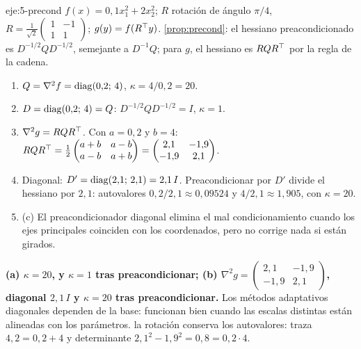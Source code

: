 \begin{solucion}{eje:5-precond}
\datos $f(x)=0{,}1x_1^{2}+2x_2^{2}$; $R$ rotación de ángulo $\pi/4$, $R=\frac{1}{\sqrt2}\begin{pmatrix}1&-1\\1&1\end{pmatrix}$; $g(y)=f(R^{\top} y)$.
\planteamiento \cref{prop:precond}: el hessiano preacondicionado es $D^{-1/2}QD^{-1/2}$, semejante a $D^{-1}Q$; para $g$, el hessiano es $RQR^{\top}$ por la regla de la cadena.
\pasos
\begin{enumerate}[label=\arabic*.]
  \item $Q=\nabla^{2}f=\operatorname{diag}(0{,}2;\,4)$, $\kappa=4/0{,}2=20$.
  \item $D=\operatorname{diag}(0{,}2;\,4)=Q$: $D^{-1/2}QD^{-1/2}=I$, $\kappa=1$.
  \item $\nabla^{2}g=RQR^{\top}$. Con $a=0{,}2$ y $b=4$: $RQR^{\top}=\frac12\begin{pmatrix}a+b&a-b\\a-b&a+b\end{pmatrix}=\begin{pmatrix}2{,}1&-1{,}9\\-1{,}9&2{,}1\end{pmatrix}$.
  \item Diagonal: $D'=\operatorname{diag}(2{,}1;\,2{,}1)=2{,}1\,I$. Preacondicionar por $D'$ divide el hessiano por $2{,}1$: autovalores $0{,}2/2{,}1\approx 0{,}09524$ y $4/2{,}1\approx 1{,}905$, con $\kappa=20$.
  \item (c) El preacondicionador diagonal elimina el mal condicionamiento cuando los ejes principales coinciden con los coordenados, pero no corrige nada si están girados.
\end{enumerate}
\resultado \textbf{(a) $\kappa=20$, y $\kappa=1$ tras preacondicionar; (b) $\nabla^{2}g=\begin{pmatrix}2{,}1&-1{,}9\\-1{,}9&2{,}1\end{pmatrix}$, diagonal $2{,}1\,I$ y $\kappa=20$ tras preacondicionar.} Los métodos adaptativos diagonales dependen de la base: funcionan bien cuando las escalas distintas están alineadas con los parámetros.
\comprobacion la rotación conserva los autovalores: traza $4{,}2=0{,}2+4$ y determinante $2{,}1^{2}-1{,}9^{2}=0{,}8=0{,}2\cdot 4$.
\end{solucion}

